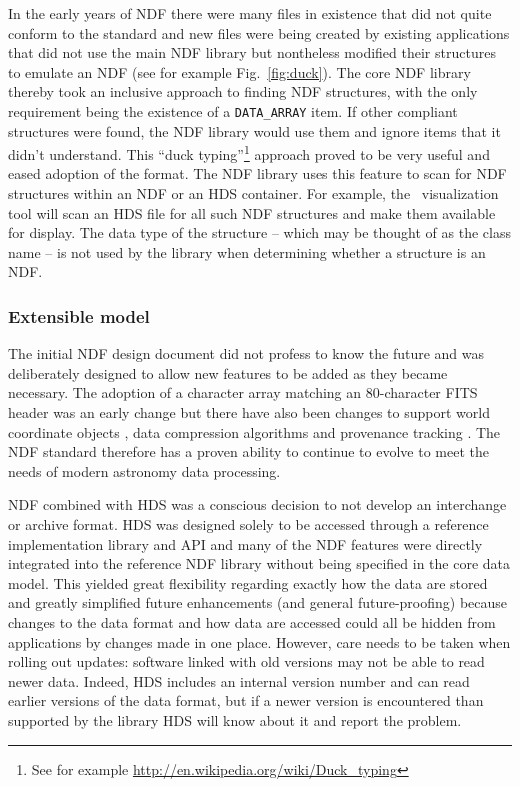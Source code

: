 \documentclass[final,authoryear,5p,times,twocolumn]{elsarticle}
\begin{document}
In the early years of NDF there were many files in existence that did
not quite conform to the standard and new files were being created by
existing applications that did not use the main NDF library but
nontheless modified their structures to emulate an NDF (see for
example Fig.\ \ref{fig:duck}). The core NDF library thereby took an
inclusive approach to finding NDF structures, with the only requirement
being the existence of a \texttt{DATA\_ARRAY} item. If other compliant
structures were found, the NDF library would use them and ignore items
that it didn't understand. This ``duck typing''\footnote{See for
  example \url{http://en.wikipedia.org/wiki/Duck_typing}} approach
proved to be very useful and eased adoption of the format. The NDF
library uses this feature to scan for NDF structures within an NDF or
an HDS container. For example, the \gaia\ visualization tool \citep[][]{2009ASPC..411..575D}
will scan an HDS file for all such NDF structures and make them
available for display. The data type of the structure -- which may be
thought of as the class name -- is not used by the library when
determining whether a structure is an NDF.

\subsubsection{Extensible model}

The initial NDF design document did not profess to know the future and
was deliberately designed to allow new features to be added as they
became necessary. The adoption of a character array matching an
80-character FITS header was an early change but there have also been
changes to support world coordinate objects
\citep{2001ASPC..238..129B}, data compression algorithms
\citep{2008ASPC..394..650C} and provenance tracking
\citep{2009ASPC..411..418J}. The NDF standard therefore has a proven
ability to continue to evolve
to meet the needs of modern astronomy data processing.

NDF combined with HDS was a conscious decision to not develop an
interchange or archive format. HDS was designed solely to be accessed
through a reference implementation library and API and many of the NDF
features were directly integrated into the reference NDF library without being
specified in the core data model.  This yielded great flexibility
regarding exactly how the data are stored and greatly simplified
future enhancements (and general future-proofing) because changes to
the data format and how data are accessed could all be hidden from
applications by changes made in one place. However, care needs to be taken
when rolling out updates: software linked with old versions
may not be able to read newer data. Indeed, HDS includes an internal
version number and can read earlier versions of the data format, but if a
newer version is encountered than supported by the library HDS will
know about it and report the problem.
\end{document}
